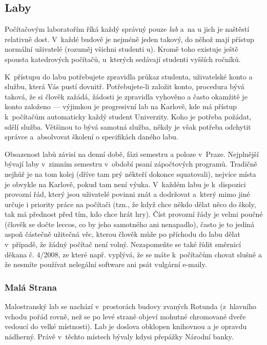 \subsection{Laby}

Počítačovým laboratořím říká každý správný \mfk{} pouze {\it lab\/}
a~na \mfz{}u jich je naštěstí relativně dost. V~každé budově je
nejméně jeden takový, do něhož mají přístup normální uživatelé
(rozuměj všichni studenti \mfz{}u). Kromě toho existuje ještě
spousta katedrových počítačů, u~kterých sedávají studenti vyšších
ročníků.

K~přístupu do labu potřebujete zpravidla průkaz studenta,
uživatelské konto a službu, která Vás pustí dovnitř.
Po\-tře\-bu\-jete-li založit konto, procedura bývá taková, že si
člověk zažádá, žádosti je zpravidla vyhověno a často okamžitě je
konto založeno --- výjimkou je progresivní lab na Karlově, kde má přístup k~počítačům automaticky každý student Univerzity. Koho je potřeba požádat, sdělí služba. Většinou to
bývá samotná služba, někdy je však potřeba odchytit správce
a~absolvovat školení o specifikách daného labu.

Obsazenost labů závisí na denní době, fázi semestru a poloze
v~Praze. Nejplnější bývají laby v~zimním semestru v~období psaní
zápočtových programů.  Tradičně nejhůř je na tom kolej (dříve tam
prý někteří dokonce squatovali), nejvíce místa je obvykle na
Karlově, pokud tam není výuka. V~každém labu je k~dispozici
provozní řád, který jsou uživatelé povinni znát a dodržovat
a~který mimo jiné určuje i priority práce na počítači (tzn., že
když chce někdo dělat něco do školy, tak má přednost před tím, kdo
chce hrát hry). Číst provozní řády je velmi
poučné (člověk se dočte leccos, co by jeho samotného ani
nenapadlo), často je to jediná aspoň částečně užitečná věc, kterou
člověk může po příchodu do labu dělat v~případě, že žádný počítač
není volný.  Nezapomeňte se také řídit směrnicí děkana č. 4/2008,
ze které např. vyplývá, že se máte k~počítačům chovat slušně a že
nesmíte používat nelegální software ani psát vulgární e-maily.

\subsubsection{Malá Strana}

Malostranský lab se nachází v~prostorách budovy zvaných Rotunda
(z~hlavního vchodu pořád rovně, než se po levé straně objeví mohutné
chromované dveře vedoucí do velké místnosti). Lab je doslova
obklopen knihovnou a je opravdu nádherný. Právě v~těchto místech
bývaly kdysi přepážky Národní banky.


